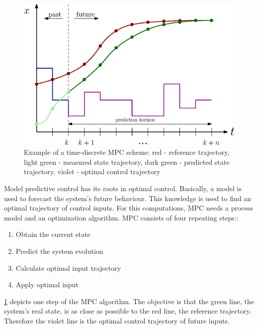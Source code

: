 \begin{figure}[t]
\begin{center}
\includegraphics[width=\textwidth]{../Figures/MPC_trajectory.eps}
\caption{Example of a time-discrete MPC scheme: red - reference trajectory, light green - measured state trajectory, dark green - predicted state trajectory, violet - optimal control trajectory}
\label{fig:controller}
\end{center}
\end{figure}

Model predictive control has its roots in optimal control. Basically, a model is used to forecast the system's future behaviour. This knowledge is used to find an optimal trajectory of control inputs. For this computations, MPC needs a process model and an optimization algorithm.
MPC consists of four repeating steps::
\begin{enumerate}
	\item Obtain the current state
	\item Predict the system evolution
	\item Calculate optimal input trajectory
	\item Apply optimal input
\end{enumerate}

\cref{fig:controller} depicts one step of the MPC algorithm. The objective is that the green line, the system's real state, is as close as possible to the red line, the reference trajectory. Therefore the violet line is the optimal control trajectory of future inputs.


